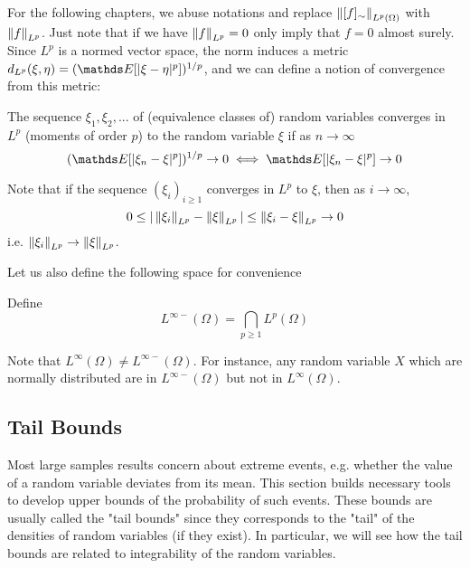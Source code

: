 For the following chapters, we abuse notations and replace $\left\| [f]_\sim \right\|_{L^p(\Omega)}$ with $\left\| f \right\|_{L^p}$. Just note that if we have $\left\| f \right\|_{L^p} = 0$ only imply that $f = 0$ almost surely. Since $L^p$ is a normed vector space, the norm induces a metric $d_{L^p}(\xi,\eta) = (\E[|\xi - \eta|^p])^{1/p}$, and we can define a notion of convergence from this metric:

\begin{definition}[$L^p$ convergence] \label{def:Lp_convergence} The sequence $\xi_1,\xi_2,...$ of (equivalence classes of) random variables converges in $L^p$ (moments of order $p$) to the random variable $\xi$ if as $n \to \infty$
\begin{equation}
    (\E[|\xi_n - \xi|^p])^{1/p} \to 0 \iff \E[|\xi_n - \xi|^p] \to 0
\end{equation}
\end{definition}

\begin{remark} Note that if the sequence $(\xi_i)_{i\geq 1}$ converges in $L^p$ to $\xi$, then as $i \to \infty$,
\begin{equation}
    0 \leq |\left\| \xi_i \right\|_{L^p} - \left\| \xi \right\|_{L^p}| \leq \left\| \xi_i - \xi \right\|_{L^p} \to 0
\end{equation}
i.e. $\left\| \xi_i \right\|_{L^p} \to \left\| \xi \right\|_{L^p}$.
\end{remark}

\begin{unexaminable}
Let us also define the following space for convenience
\begin{definition} Define 
\begin{equation}
    L^{\infty-}(\Omega) = \bigcap_{p \geq 1} L^p(\Omega)
\end{equation}

Note that $L^\infty(\Omega) \neq L^{\infty-}(\Omega)$. For instance, any random variable $X$ which are normally distributed are in $L^{\infty-}(\Omega)$ but not in $L^\infty(\Omega)$.
\end{definition}
\end{unexaminable}


\subsection{Tail Bounds}
Most large samples results concern about extreme events, e.g. whether the value of a random variable deviates from its mean. This section builds necessary tools to develop upper bounds of the probability of such events. These bounds are usually called the "tail bounds" since they corresponds to the "tail" of the densities of random variables (if they exist). In particular, we will see how the tail bounds are related to integrability of the random variables.\\

